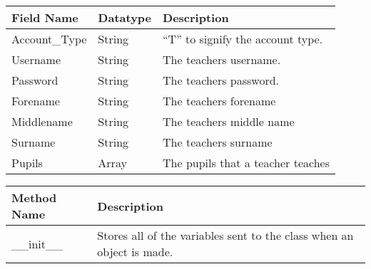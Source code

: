 \documentclass[letterpaper]{article}
\title{}
\author{}
\date{2015-04-01}
\begin{document}
\bigskip

\begin{center}
\tablefirsthead{}
\tablehead{}
\tabletail{}
\tablelasttail{}
\begin{supertabular}{|m{1.6525599in}|m{1.6525599in}|m{3.38376in}|}
\hline
Field Name &
Datatype &
Description\\\hline
Account\_Type &
String &
{}``T{}'' to signify the account type.\\\hline
Username &
String &
The teachers username.\\\hline
Password &
String &
The teachers password.\\\hline
Forename &
String &
The teachers forename\\\hline
Middlename &
String &
The teachers middle name\\\hline
Surname &
String &
The teachers surname \\\hline
Pupils &
Array &
The pupils that a teacher teaches\\\hline
\end{supertabular}
\end{center}

\bigskip


\bigskip


\bigskip


\bigskip


\bigskip

\begin{center}
\tablefirsthead{}
\tablehead{}
\tabletail{}
\tablelasttail{}
\begin{supertabular}{|m{3.38376in}|m{3.38376in}|}
\hline
Method Name &
Description\\\hline
\_\_init\_\_ &
Stores all of the variables sent to the class when an object is made.\\\hline
\end{supertabular}
\end{center}

\bigskip
\end{document}
